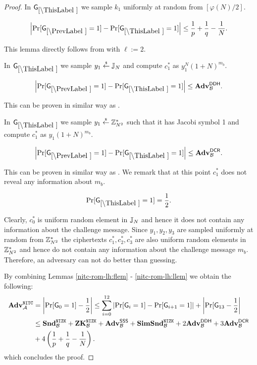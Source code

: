 \begin{proof}
In $\games_\thisgame$ we sample $k_1$ uniformly at random from $[\varphi(N)/2]$. 

\begin{lemma}
\[
\left|\Pr[\games_\prevgame = 1] - \Pr[\games_\thisgame = 1]\right| \leq \frac{1}{p}+\frac{1}{q}-\frac{1}{N}.
\]
\end{lemma}

This lemma directly follows from  with $\ell:=2$.

In $\games_\thisgame$ we sample $y_1 \stackrel{{\scriptscriptstyle\$}}{\leftarrow} \mathbb{J}_N$ and compute $c_1^*$ as  $y_1^{N} (1+N)^{m_b}$. 

\begin{lemma}
\[
\left|\Pr[\games_\prevgame = 1] - \Pr[\games_\thisgame = 1]\right| \leq \advtg_\advB^\ddh.
\]
\end{lemma}
This can be proven in similar way as .

In $\games_\thisgame$ we sample $y_1 \stackrel{{\scriptscriptstyle\$}}{\leftarrow} \mathbb{Z}_{N^2}^*$ such that it has Jacobi symbol 1 and compute $c_1^*$ as $y_1(1+N)^{m_b}$. 

\begin{lemma}
\[
\left|\Pr[\games_\prevgame = 1] - \Pr[\games_\thisgame = 1]\right| \leq \advtg_\advB^\dcr.
\]
\end{lemma}
This can be proven in similar way as . We remark that at this point $c_1^*$ does not reveal any information about $m_b$.

\begin{lemma}\label{nitc-rom-lh:llem}
\[
\Pr[\games_\thisgame = 1] = \half.
\]
\end{lemma}

Clearly, $c_0^*$ is uniform random element in $\mathbb{J}_N$ and hence it does not contain any information about the challenge message. Since $y_1, y_2, y_3$ are sampled uniformly at random from $\mathbb{Z}_{N^2}^*$ the ciphertexts $c_1^*, c_2^*, c_3^*$ are also uniform random elements in $\mathbb{Z}_{N^2}^*$ and hence do not contain any information about the challenge message $m_b$. Therefore, an adversary can not do better than guessing.

By combining Lemmas \ref{nitc-rom-lh:flem} - \ref{nitc-rom-lh:llem} we obtain the following:
\begin{align*}
\mathbf{Adv}^{\mathtt{NITC}}_{\mathcal{A}} &= \left| \Pr[\mathsf{G}_0 = 1] - \frac{1}{2} \right| \leq \sum_{i=0}^{12} \left|\Pr[\mathsf{G}_i = 1] - \Pr[\mathsf{G}_{i+1} = 1] \right| + \left|\Pr[\mathsf{G}_{13}- \frac{1}{2}\right| \\
 &\leq  \mathbf{Snd}^{\mathtt{NIZK}}_{\mathcal{B}} + \mathbf{ZK}^{\mathtt{NIZK}}_{\mathcal{B}} + \mathbf{Adv}^{\mathsf{SSS}}_{\mathcal{B}} + \mathbf{SimSnd}^{\mathtt{NIZK}}_{\mathcal{B}} + 2 \mathbf{Adv}^{\mathsf{DDH}}_{\mathcal{B}} + 3 \mathbf{Adv}^{\mathsf{DCR}}_{\mathcal{B}} \\ &+ 4 \left( \frac{1}{p}+\frac{1}{q}-\frac{1}{N} \right).
\end{align*}
which concludes the proof.
\end{proof}




